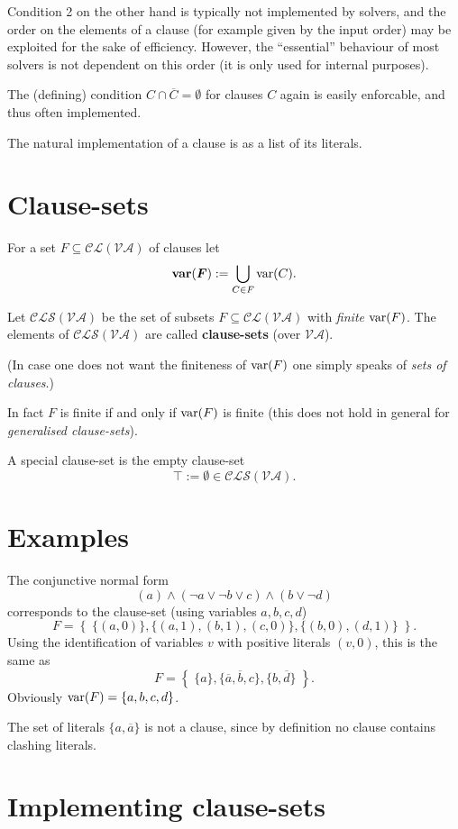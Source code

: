 \documentclass{article}
\def\mva{{\mathcal{VA}}}
\def\mcl{{\mathcal{CL}}}
\def\mcls{{\mathcal{CLS}}}
\def\pmva{{\pmb{\mathcal{VA}}}}
\def\pmcls{{\pmb{\mathcal{CLS}}}}
\def\var{{\rm var}}
\def\bvar{{\bf var}}
\begin{document}
Condition 2 on the other hand is typically not implemented by solvers, and the order on the elements of a clause (for example given by the input order) may be exploited for the sake of efficiency. However, the ``essential'' behaviour of most solvers is not dependent on this order (it is only used for internal purposes).

The (defining) condition $C\cap \overline{C} = \emptyset$ for clauses $C$ again is easily enforcable, and thus often implemented.

The natural implementation of a clause is as a list of its literals.


\section{Clause-sets}%

For a set $F\subseteq \mcl(\mva)$ of clauses let
\[
\bvar({\bm F}) := \bigcup\limits_{C\in F} \var(C).
\]

Let $\pmcls(\pmva)$ be the set of subsets $F\subseteq \mcl(\mva)$ with \textit{finite} $\var(F)$. The elements of $\mcls(\mva)$ are called \textbf{clause-sets} (over $\mva$).

(In case one does not want the finiteness of $\var(F)$ one simply speaks of \textit{sets of clauses}.)

In fact $F$ is finite if and only if $\var(F)$ is finite (this does not hold in general for \textit{generalised clause-sets}).

A special clause-set is the empty clause-set
\[
\top := \emptyset \in \mcls(\mva).
\]


\section{Examples}%

The conjunctive normal form
\[
(a) \wedge (\neg a \vee \neg b \vee c) \wedge (b \vee \neg d)
\]
corresponds to the clause-set (using variables $a, b, c, d$)
\[
F = \left\{ \; \{(a,0)\}, \{(a,1), (b,1), (c,0)\},\{(b,0), (d,1)\} \; \right\}.
\]
Using the identification of variables $v$ with positive literals $(v,0)$, this is the same as
\[
F = \left\{ \; \{a\}, \{\overline{a}, \overline{b}, c\}, \{b, \overline{d}\} \; \right\}.
\]
Obviously $\var(F) = \{a, b, c, d\}$.

The set of literals $\{a, \overline{a}\}$ is not a clause, since by definition no clause contains clashing literals.

\section{Implementing clause-sets}%
\end{document}
